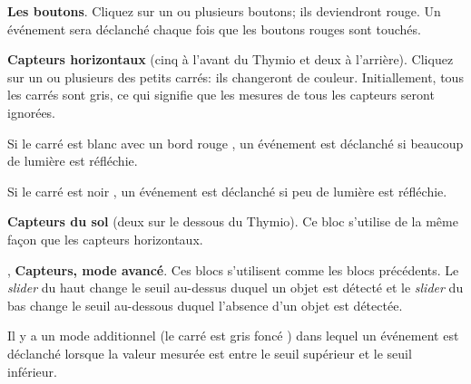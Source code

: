 \label{a.blocks}


 \textbf{Les boutons}.
Cliquez sur un ou plusieurs boutons;
ils deviendront rouge. Un événement sera déclanché chaque fois que les boutons rouges sont touchés.

\bigskip\bigskip

 \textbf{Capteurs horizontaux} (cinq à l'avant du Thymio et deux à l'arrière).
Cliquez sur un ou plusieurs des petits carrés: ils changeront de couleur.
Initiallement, tous les carrés sont gris, ce qui signifie que les mesures de tous les capteurs seront 
ignorées.

Si le carré est blanc avec un bord rouge , un événement est déclanché
si beaucoup de lumière est réfléchie.

Si le carré est noir , un événement est déclanché si peu de lumière est réfléchie.

\bigskip


\bigskip

 \textbf{Capteurs du sol} (deux sur le dessous du Thymio).
Ce bloc s'utilise de la même façon que les capteurs horizontaux.

\bigskip\bigskip

,  \textbf{Capteurs, mode avancé}.
Ces blocs s'utilisent comme les blocs précédents. Le \emph{slider} du haut change le seuil au-dessus duquel un objet est détecté et le \emph{slider} du bas change le seuil au-dessous duquel l'absence d'un
objet est détectée.

\bigskip\bigskip

Il y a un mode additionnel (le carré est gris foncé )
dans lequel un événement est déclanché lorsque la valeur mesurée est entre le seuil supérieur et
le seuil inférieur.


